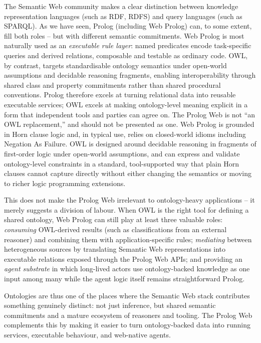The Semantic Web community makes a clear distinction between knowledge representation languages (such as RDF, RDFS) and query languages (such as SPARQL). As we have seen, Prolog (including Web Prolog) can, to some extent, fill both roles -- but with different semantic commitments. Web Prolog is most naturally used as an \emph{executable rule layer}: named predicates encode task-specific queries and derived relations, composable and testable as ordinary code. OWL, by contrast, targets standardisable ontology semantics under open-world assumptions and decidable reasoning fragments, enabling interoperability through shared class and property commitments rather than shared procedural conventions. Prolog therefore excels at turning relational data into reusable executable services; OWL excels at making ontology-level meaning explicit in a form that independent tools and parties can agree on.
The Prolog Web is not ``an OWL replacement,'' and should not be presented as one. Web Prolog is grounded in Horn clause logic and, in typical use, relies on closed-world idioms including Negation As Failure. OWL is designed around decidable reasoning in fragments of first-order logic under open-world assumptions, and can express and validate ontology-level constraints in a standard, tool-supported way that plain Horn clauses cannot capture directly without either changing the semantics or moving to richer logic programming extensions.

This does not make the Prolog Web irrelevant to ontology-heavy applications -- it merely suggests a division of labour. When OWL is the right tool for defining a shared ontology, Web Prolog can still play at least three valuable roles: \emph{consuming} OWL-derived results (such as classifications from an external reasoner) and combining them with application-specific rules; \emph{mediating} between heterogeneous sources by translating Semantic Web representations into executable relations exposed through the Prolog Web APIs; and providing an \emph{agent substrate} in which long-lived actors use ontology-backed knowledge as one input among many while the agent logic itself remains straightforward Prolog.

Ontologies are thus one of the places where the Semantic Web stack contributes something genuinely distinct: not just inference, but shared semantic commitments and a mature ecosystem of reasoners and tooling. The Prolog Web complements this by making it easier to turn ontology-backed data into running services, executable behaviour, and web-native agents.

